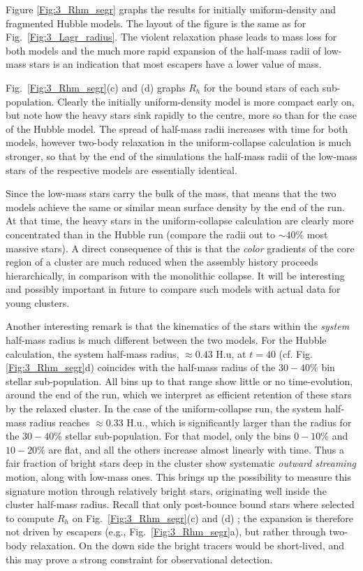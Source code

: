 Figure \ref{Fig:3_Rhm_segr} graphs the results for initially uniform-density and fragmented Hubble models. The layout of the figure is the same as for Fig.~\ref{Fig:3_Lagr_radius}. The violent relaxation phase leads to mass loss for both models and the much more rapid expansion of the half-mass radii of low-mass stars is an indication that most escapers have a lower value of mass.

 Fig.~\ref{Fig:3_Rhm_segr}(c) and (d) graphs $R_h$ for the bound stars of each sub-population. Clearly the initially uniform-density model is more compact early on, but note how the heavy stars sink rapidly to the centre, more so than for the case of the Hubble model. The spread of half-mass radii increases with time for both models, however two-body relaxation in the uniform-collapse calculation is much stronger, so that by the end of the simulations the half-mass radii of the low-mass stars of the respective models are essentially identical. 
 
 Since the low-mass stars carry the bulk of the mass, that means that the two models achieve the same or similar mean surface density by the end of the run. At that time, the heavy stars in the uniform-collapse calculation are clearly more concentrated than in the Hubble run (compare the radii out to $\sim 40\%$ most massive stars). A direct consequence of this is that the {\it color} gradients of the core region of a cluster are much reduced when the assembly history proceeds hierarchically, in comparison with the monolithic collapse. It will be interesting and possibly important in future to compare such models with actual data for young clusters.

Another interesting remark is that the kinematics of the stars within the {\it system} half-mass radius is much different between the two models. For the Hubble calculation, the system half-mass radius, $ \approx 0.43 $ H.u, at $t = 40$ (cf. Fig.\ref{Fig:3_Rhm_segr}d) coincides with the half-mass radius of the $30-40\%$ bin stellar sub-population. All bins up to that range show little or no time-evolution, around the end of the run, which we interpret as efficient retention of these stars by the relaxed cluster. In the case of the uniform-collapse run, the system half-mass radius reaches $\approx 0.33$ H.u., which is significantly larger than the radius for the $30-40\%$ stellar sub-population. For that model, only the bins $0-10\%$ and $10-20\%$ are flat, and all the others increase almost linearly with time. Thus a fair fraction of bright stars deep in the cluster show systematic {\it outward streaming} motion, along with low-mass ones. This brings up the possibility to measure this signature motion through relatively bright stars, originating well inside the cluster half-mass radius. Recall that only post-bounce bound stars where selected to compute $R_h$ on Fig.~\ref{Fig:3_Rhm_segr}(c) and (d) ; the expansion is therefore not driven by escapers (e.g., Fig.~\ref{Fig:3_Rhm_segr}a), but rather through two-body relaxation. On the down side the bright tracers would be short-lived, and this may prove a strong constraint for observational detection.


